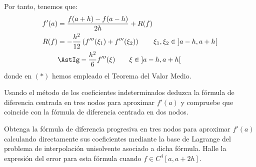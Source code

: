 \begin{ejercicio}
\begin{enumerate}
        Por tanto, tenemos que:
        \begin{align*}
            f'(a) &= \frac{f(a+h) - f(a-h)}{2h} + R(f)\\
            R(f) &= -\dfrac{h^2}{12}\left(f'''(\xi_1) + f'''(\xi_2)\right)\qquad \xi_1, \xi_2\in\left]a-h, a+h\right[
                \\&\AstIg -\dfrac{h^2}{6}f'''(\xi)\qquad \xi\in\left]a-h, a+h\right[
        \end{align*}
        donde en $(\ast)$ hemos empleado el Teorema del Valor Medio.
    \end{enumerate}    
\end{ejercicio}

\begin{ejercicio}\label{ej:2.1.2}
    Usando el método de los coeficientes indeterminados deduzca la fórmula de diferencia centrada en tres nodos para aproximar $f'(a)$ y compruebe que coincide con la fórmula de diferencia centrada en dos nodos.
\end{ejercicio}

\begin{ejercicio}\label{ej:2.1.3}
    Obtenga la fórmula de diferencia progresiva en tres nodos para aproximar $f'(a)$ calculando directamente sus coeficientes mediante la base de Lagrange del problema de interpolación unisolvente asociado a dicha fórmula. Halle la expresión del error para esta fórmula cuando $f \in C^4[a, a + 2h]$.
\end{ejercicio}

